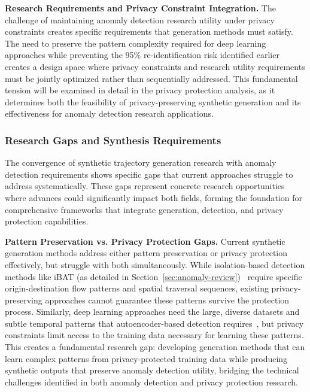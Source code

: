 \documentclass[runningheads]{llncs}
\begin{document}
\textbf{Research Requirements and Privacy Constraint Integration.} The challenge of maintaining anomaly detection research utility under privacy constraints creates specific requirements that generation methods must satisfy. The need to preserve the pattern complexity required for deep learning approaches while preventing the 95\% re-identification risk identified earlier creates a design space where privacy constraints and research utility requirements must be jointly optimized rather than sequentially addressed. This fundamental tension will be examined in detail in the privacy protection analysis, as it determines both the feasibility of privacy-preserving synthetic generation and its effectiveness for anomaly detection research applications.

\subsubsection{Research Gaps and Synthesis Requirements}

The convergence of synthetic trajectory generation research with anomaly detection requirements shows specific gaps that current approaches struggle to address systematically. These gaps represent concrete research opportunities where advances could significantly impact both fields, forming the foundation for comprehensive frameworks that integrate generation, detection, and privacy protection capabilities.

\textbf{Pattern Preservation vs. Privacy Protection Gaps.} Current synthetic generation methods address either pattern preservation or privacy protection effectively, but struggle with both simultaneously. While isolation-based detection methods like iBAT (as detailed in Section~\ref{sec:anomaly-review})~\cite{zhang2019ibat} require specific origin-destination flow patterns and spatial traversal sequences, existing privacy-preserving approaches cannot guarantee these patterns survive the protection process. Similarly, deep learning approaches need the large, diverse datasets and subtle temporal patterns that autoencoder-based detection requires~\cite{huang2021lstm}, but privacy constraints limit access to the training data necessary for learning these patterns. This creates a fundamental research gap: developing generation methods that can learn complex patterns from privacy-protected training data while producing synthetic outputs that preserve anomaly detection utility, bridging the technical challenges identified in both anomaly detection and privacy protection research.
\end{document}
